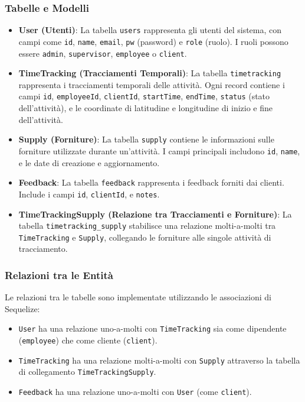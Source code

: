 \documentclass[twoside]{supsistudent}
\begin{document}
\subsubsection{Tabelle e Modelli}
\begin{itemize}
  \item \textbf{User (Utenti)}: La tabella \texttt{users} rappresenta gli utenti del sistema, con campi come \texttt{id}, \texttt{name}, \texttt{email}, \texttt{pw} (password) e \texttt{role} (ruolo). I ruoli possono essere \texttt{admin}, \texttt{supervisor}, \texttt{employee} o \texttt{client}.
  \item \textbf{TimeTracking (Tracciamenti Temporali)}: La tabella \texttt{timetracking} rappresenta i tracciamenti temporali delle attività. Ogni record contiene i campi \texttt{id}, \texttt{employeeId}, \texttt{clientId}, \texttt{startTime}, \texttt{endTime}, \texttt{status} (stato dell'attività), e le coordinate di latitudine e longitudine di inizio e fine dell'attività.
  \item \textbf{Supply (Forniture)}: La tabella \texttt{supply} contiene le informazioni sulle forniture utilizzate durante un'attività. I campi principali includono \texttt{id}, \texttt{name}, e le date di creazione e aggiornamento.
  \item \textbf{Feedback}: La tabella \texttt{feedback} rappresenta i feedback forniti dai clienti. Include i campi \texttt{id}, \texttt{clientId}, e \texttt{notes}.
  \item \textbf{TimeTrackingSupply (Relazione tra Tracciamenti e Forniture)}: La tabella \texttt{timetracking\_supply} stabilisce una relazione molti-a-molti tra \texttt{TimeTracking} e \texttt{Supply}, collegando le forniture alle singole attività di tracciamento.
\end{itemize}

\subsubsection{Relazioni tra le Entità}
Le relazioni tra le tabelle sono implementate utilizzando le associazioni di Sequelize:
\begin{itemize}
  \item \texttt{User} ha una relazione uno-a-molti con \texttt{TimeTracking} sia come dipendente (\texttt{employee}) che come cliente (\texttt{client}).
  \item \texttt{TimeTracking} ha una relazione molti-a-molti con \texttt{Supply} attraverso la tabella di collegamento \texttt{TimeTrackingSupply}.
  \item \texttt{Feedback} ha una relazione uno-a-molti con \texttt{User} (come \texttt{client}).
\end{itemize}
\end{document}
